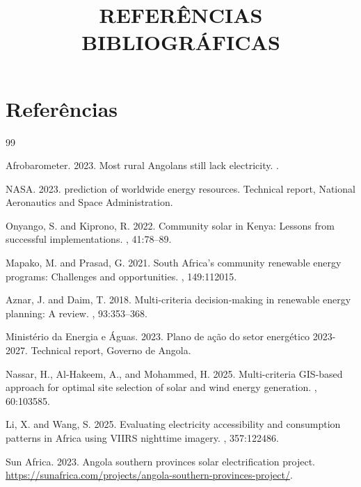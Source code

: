 \documentclass[12pt,a4paper]{article}
\title{\textbf{REFERÊNCIAS BIBLIOGRÁFICAS}}
\author{}
\date{}
\begin{document}
\maketitle

\section*{Referências}

\begin{thebibliography}{99}

Afrobarometer. 2023.
\newblock Most rural {A}ngolans still lack electricity.
.

NASA. 2023.
 prediction of worldwide energy resources.
\newblock Technical report, National Aeronautics and Space Administration.

Onyango, S. and Kiprono, R. 2022.
\newblock Community solar in {K}enya: {L}essons from successful implementations.
, 41:78--89.

Mapako, M. and Prasad, G. 2021.
\newblock South {A}frica's community renewable energy programs: {C}hallenges and opportunities.
, 149:112015.

Aznar, J. and Daim, T. 2018.
\newblock Multi-criteria decision-making in renewable energy planning: {A} review.
, 93:353--368.

Ministério da Energia e Águas. 2023.
\newblock Plano de ação do setor energético 2023-2027.
\newblock Technical report, Governo de Angola.

Nassar, H., Al-Hakeem, A., and Mohammed, H. 2025.
\newblock Multi-criteria {GIS}-based approach for optimal site selection of solar and wind energy generation.
, 60:103585.

Li, X. and Wang, S. 2025.
\newblock Evaluating electricity accessibility and consumption patterns in {A}frica using {VIIRS} nighttime imagery.
, 357:122486.

Sun Africa. 2023.
\newblock Angola southern provinces solar electrification project.
\newblock \url{https://sunafrica.com/projects/angola-southern-provinces-project/}.


\end{thebibliography}
\end{document}
